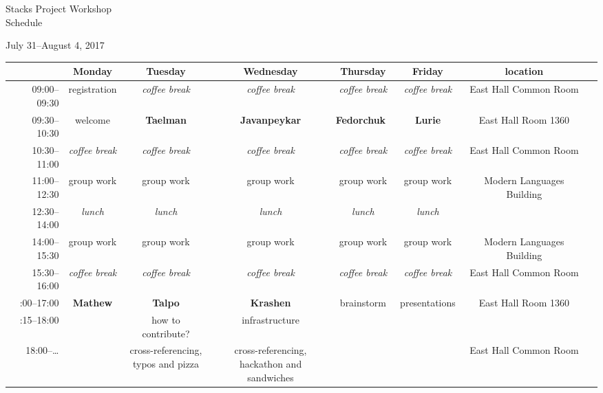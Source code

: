 \documentclass[letterpaper,11pt]{article}
\begin{document}

\begin{landscape}

  \newcommand\coffeebreak{\emph{coffee break}}
  \newcommand\groupwork{group work}
  \newcommand\lunch{\emph{lunch}}
  \renewcommand{\arraystretch}{1.35}

\begin{center}
{\Large Stacks Project Workshop \\
Schedule}

{\large July 31--August 4, 2017} \\

\vspace{10pt}


    \begin{tabular}{rccccccc}
      \toprule
                    & Monday              & Tuesday             & Wednesday            & Thursday           & Friday          & location \\
      \midrule
      09:00--09:30  & registration        & \coffeebreak        & \coffeebreak         & \coffeebreak       & \coffeebreak    & East Hall Common Room\\
      09:30--10:30  & welcome             & \textbf{Taelman}    & \textbf{Javanpeykar} & \textbf{Fedorchuk} & \textbf{Lurie}  & East Hall Room 1360 \\
      10:30--11:00  & \coffeebreak        & \coffeebreak        & \coffeebreak         & \coffeebreak       & \coffeebreak    & East Hall Common Room \\
      11:00--12:30  & \groupwork          & \groupwork          & \groupwork           & \groupwork         & \groupwork      & Modern Languages Building \\
      12:30--14:00  & \lunch              & \lunch              & \lunch               & \lunch             & \lunch             \\
      14:00--15:30  & \groupwork          & \groupwork          & \groupwork           & \groupwork         & \groupwork      & Modern Languages Building \\
      15:30--16:00  & \coffeebreak        & \coffeebreak        & \coffeebreak         & \coffeebreak       & \coffeebreak    & East Hall Common Room \\\medskip
      16:00--17:00  & \textbf{Mathew}     & \textbf{Talpo}      & \textbf{Krashen}     & brainstorm         & presentations   & East Hall Room 1360 \\\smallskip
      17:15--18:00  &                     & how to contribute?  & infrastructure \\
      18:00--\ldots &                     & \parbox{3cm}{\centering cross-referencing, \\ typos and pizza} & \parbox{3cm}{\centering cross-referencing, \\ hackathon and sandwiches} & & & East Hall Common Room \\
      \bottomrule
    \end{tabular}


\end{center}
\end{landscape}
\end{document}
